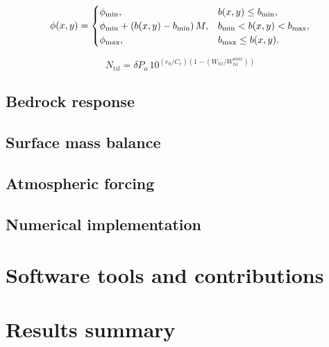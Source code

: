 \documentclass{article}
\begin{document}
\begin{equation}
  \phi(x,y) =
  \begin{cases}
    \phi_{\mathrm{min}}, & b(x,y) \le b_{\mathrm{min}}, \\
    \phi_{\mathrm{min}} + (b(x,y) - b_{\mathrm{min}}) \,M, & b_{\mathrm{min}} < b(x,y) < b_{\mathrm{max}}, \\
    \phi_{\mathrm{max}}, & b_{\mathrm{max}} \le b(x,y).
  \end{cases}
  \label{eq:phipiecewise}
\end{equation}

\begin{equation}
N_{til} = \delta P_o \, 10^{(e_0/C_c)
          \left(1 - (W_{til}/W_{til}^{max})\right)}
\end{equation}

\subsection{Bedrock response}
\subsection{Surface mass balance}
\subsection{Atmospheric forcing}
\subsection{Numerical implementation}



\section{Software tools and contributions}


\section{Results summary}
\end{document}

